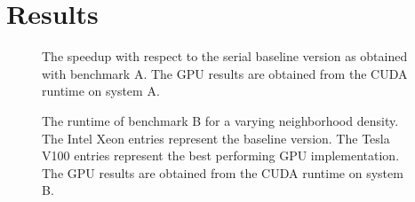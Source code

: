 \documentclass[conference]{IEEEtran}
\begin{document}

\section{Results} \label{sec:results}

\begin{figure}[!t]
    \centering
    
    \caption{The speedup with respect to the serial baseline version as obtained with benchmark A. The GPU results are obtained from the CUDA runtime on system A.}
    \label{fig:benchmarkA_speedups}
\end{figure}

\begin{figure}[!t]
    \centering
    
    \caption{The runtime of benchmark B for a varying neighborhood density. The Intel Xeon entries represent the baseline version. The Tesla V100 entries represent the best performing GPU implementation. The GPU results are obtained from the CUDA runtime on system B.}
    \label{fig:benchmarkB_runtimes}
\end{figure}
\end{document}
